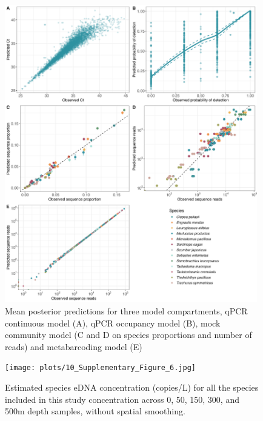 \documentclass[9pt,twoside,lineno]{pnas-SI}
\begin{document}
\begin{figure}
\centering
\includegraphics[width=0.98\textwidth]{plots/9_Supplementary_Figure_5.jpg}
\caption{Mean posterior predictions for three model compartments, qPCR continuous model (A), qPCR occupancy model (B), mock community model (C and D on species proportions and number of reads) and metabarcoding model (E)}
\end{figure}

\begin{figure}
\centering
\texttt{[image: plots/10\_Supplementary\_Figure\_6.jpg]}
\caption{Estimated species eDNA concentration (copies/L) for all the species included in this study concentration across 0, 50, 150, 300, and 500m depth samples, without spatial smoothing.}
\end{figure}
\end{document}
